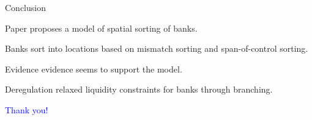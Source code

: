 \documentclass[notes,10pt, aspectratio=169]{beamer}
\newenvironment{wideitemize}{\itemize\addtolength{\itemsep}{10pt}}{\enditemize}
\begin{document}
     







\begin{frame}{Conclusion}
        \begin{wideitemize}

            \item Paper proposes a model of spatial sorting of banks.
    
            \item Banks sort into locations based on mismatch sorting and span-of-control sorting.
            \item Evidence evidence seems to support the model.
            \item Deregulation relaxed liquidity constraints for banks through branching.
        \end{wideitemize}
    \end{frame}
    

    \begin{frame}{}
        \centering
        \huge \textcolor{blue}{Thank you!}
    \end{frame}
\end{document}
